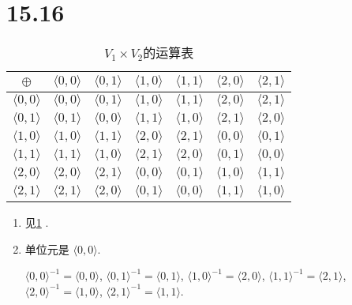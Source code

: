 \documentclass[8pt]{article}
\theoremstyle{compact}
\begin{document}
\section*{15.16}
\begin{table}[h]
	\centering
	\begin{tabular}{c|cccccc}
		$\oplus$ & $\langle 0, 0 \rangle$ & $\langle 0, 1 \rangle$ & $\langle 1, 0 \rangle$ & $\langle 1, 1 \rangle$ & $\langle 2, 0 \rangle$ & $\langle 2, 1 \rangle$ \\ \hline
		$\langle 0, 0 \rangle$ & $\langle 0, 0 \rangle$ & $\langle 0, 1 \rangle$ & $\langle 1, 0 \rangle$ & $\langle 1, 1 \rangle$ & $\langle 2, 0 \rangle$ & $\langle 2, 1 \rangle$ \\
		$\langle 0, 1 \rangle$ & $\langle 0, 1 \rangle$ & $\langle 0, 0 \rangle$ & $\langle 1, 1 \rangle$ & $\langle 1, 0 \rangle$ & $\langle 2, 1 \rangle$ & $\langle 2, 0 \rangle$ \\
		$\langle 1, 0 \rangle$ & $\langle 1, 0 \rangle$ & $\langle 1, 1 \rangle$ & $\langle 2, 0 \rangle$ & $\langle 2, 1 \rangle$ & $\langle 0, 0 \rangle$ & $\langle 0, 1 \rangle$ \\
		$\langle 1, 1 \rangle$ & $\langle 1, 1 \rangle$ & $\langle 1, 0 \rangle$ & $\langle 2, 1 \rangle$ & $\langle 2, 0 \rangle$ & $\langle 0, 1 \rangle$ & $\langle 0, 0 \rangle$ \\
		$\langle 2, 0 \rangle$ & $\langle 2, 0 \rangle$ & $\langle 2, 1 \rangle$ & $\langle 0, 0 \rangle$ & $\langle 0, 1 \rangle$ & $\langle 1, 0 \rangle$ & $\langle 1, 1 \rangle$ \\
		$\langle 2, 1 \rangle$ & $\langle 2, 1 \rangle$ & $\langle 2, 0 \rangle$ & $\langle 0, 1 \rangle$ & $\langle 0, 0 \rangle$ & $\langle 1, 1 \rangle$ & $\langle 1, 0 \rangle$ \\
	\end{tabular}
	\caption{$V_1 \times V_2$的运算表}
	\label{tab}
\end{table}


\begin{enumerate}
	\item 见\cref{tab} .
	\item 单位元是 $\langle 0, 0 \rangle$.
			
	$\langle 0, 0 \rangle^{-1} = \langle 0, 0 \rangle$,
 		$\langle 0, 1 \rangle^{-1} = \langle 0, 1 \rangle$,
 		$\langle 1, 0 \rangle^{-1} = \langle 2, 0 \rangle$,
 		$\langle 1, 1 \rangle^{-1} = \langle 2, 1 \rangle$,
 		$\langle 2, 0 \rangle^{-1} = \langle 1, 0 \rangle$,
 		$\langle 2, 1 \rangle^{-1} = \langle 1, 1 \rangle$.

\end{enumerate}
\end{document}
